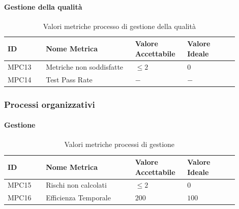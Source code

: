 \documentclass[a4paper,12pt]{article}
\begin{document}
                \paragraph{Gestione della qualità} \mbox{}
                    \begin{longtable}{|M{0.15\linewidth}|M{0.35\linewidth}|M{0.2\linewidth}|M{0.2\linewidth}|}

                        \caption{Valori metriche processo di gestione della qualità} \\
                        \hline
                        \textbf{ID} & \textbf{Nome Metrica} & \textbf{Valore Accettabile} & \textbf{Valore Ideale} \\
                        \hline
                        \endhead

                        MPC13 & Metriche non soddisfatte & $\le 2$ & $0$ \\
                        \hline

                        MPC14 & Test Pass Rate & $-$ & $-$ \\
                        \hline

                    \end{longtable}


            \subsubsection{Processi organizzativi}
                \paragraph{Gestione} \mbox{}
                    \begin{longtable}{|M{0.15\linewidth}|M{0.35\linewidth}|M{0.2\linewidth}|M{0.2\linewidth}|}

                        \caption{Valori metriche processi di gestione} \\
                        \hline
                        \textbf{ID} & \textbf{Nome Metrica} & \textbf{Valore Accettabile} & \textbf{Valore Ideale} \\
                        \hline
                        \endhead

                        MPC15 & Rischi non calcolati & $\le 2$ & $0$ \\
                        \hline

                        MPC16 & Efficienza Temporale & $200$ & $100$ \\
                        \hline

                    \end{longtable}
\end{document}
